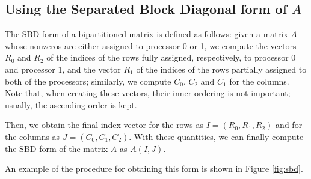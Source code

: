 \subsection{Using the Separated Block Diagonal form of $A$}

The SBD form of a bipartitioned matrix \cite{yzelman_cache} is defined as follows: given a matrix $A$ whose nonzeros are either assigned to processor 0 or 1, we compute the vectors $R_0$ and $R_2$ of the indices of the rows fully assigned, respectively, to processor 0 and processor 1, and the vector $R_1$ of the indices of the rows partially assigned to both of the processors; similarly, we compute $C_0$, $C_2$ and $C_1$ for the columns. Note that, when creating these vectors, their inner ordering is not important; usually, the ascending order is kept.

Then, we obtain the final index vector for the rows as $I = (R_0,R_1,R_2)$ and for the columns as $J = (C_0,C_1,C_2)$. With these quantities, we can finally compute the SBD form of the matrix $A$ as $A(I,J)$. 

An example of the procedure for obtaining this form is shown in Figure \ref{fig:sbd}.

